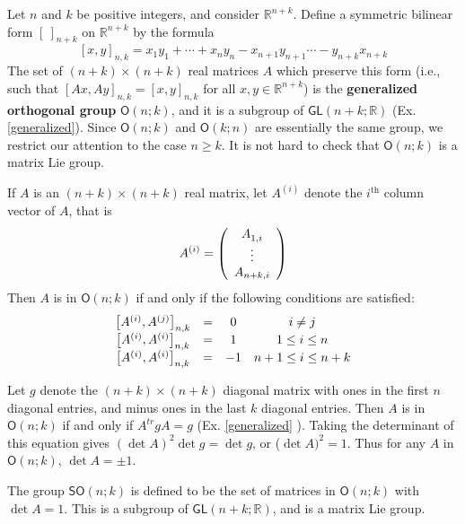 \documentclass{amsbook}
\theoremstyle{plain}
\numberwithin{equation}{chapter}
\numberwithin{theorem}{chapter}
\begin{document}
Let $n$ and $k$ be positive integers, and consider $\mathbb{R}^{n+k}$. Define
a symmetric bilinear form $\left[  \ \right]  _{n+k}$ on $\mathbb{R}^{n+k}$ by
the formula
\begin{equation}
\left[  x,y\right]  _{n,k}=x_{1}y_{1}+\cdots+x_{n}y_{n}-x_{n+1}y_{n+1}%
\cdots-y_{n+k}x_{n+k}\label{bilinear}%
\end{equation}
The set of $(n+k)\times(n+k)$ real matrices $A$ which preserve this form
(i.e., such that $\left[  Ax,Ay\right]  _{n,k}=\left[  x,y\right]  _{n,k}$ for
all $x,y\in\mathbb{R}^{n+k}$) is the \textbf{generalized orthogonal group}
$\mathsf{O}(n;k)$, and it is a subgroup of $\mathsf{GL}(n+k;\mathbb{R})$ (Ex.
\ref{generalized}). Since $\mathsf{O}(n;k)$ and $\mathsf{O}(k;n)$ are
essentially the same group, we restrict our attention to the case $n\geq k$.
It is not hard to check that $\mathsf{O}(n;k)$ is a matrix Lie group.

If $A$ is an $(n+k)\times(n+k)$ real matrix, let $A^{(i)}$ denote the
$i^{\text{th}}$ column vector of $A$, that is
\[
A^{(i)}=\left(
\begin{array}
[c]{c}%
A_{1,i}^{}\\
\vdots\\
A_{n+k,i}%
\end{array}
\right)
\]
Then $A$ is in $\mathsf{O}(n;k)$ if and only if the following conditions are
satisfied:
\begin{equation}%
\begin{array}
[c]{cccc}%
\left[  A^{(i)},A^{(j)}\right]  _{n,k} & = & 0 & i\neq j\\
\left[  A^{(i)},A^{(i)}\right]  _{n,k} & = & 1 & 1\leq i\leq n\\
\left[  A^{(i)},A^{(i)}\right]  _{n,k} & = & -1 & n+1\leq i\leq n+k
\end{array}
\end{equation}

Let $g$ denote the $(n+k)\times(n+k)$ diagonal matrix with ones in the first
$n$ diagonal entries, and minus ones in the last $k$ diagonal entries. Then
$A$ is in $\mathsf{O}(n;k)$ if and only if $A^{tr}gA=g$ (Ex. \ref{generalized}%
). Taking the determinant of this equation gives $(\det A)^{2}\det g=\det g$,
or ($\det A)^{2}=1$. Thus for any $A$ in $\mathsf{O}(n;k)$, $\det A=\pm1$.

The group $\mathsf{SO}(n;k)$ is defined to be the set of matrices in
$\mathsf{O}(n;k)$ with $\det A=1$. This is a subgroup of $\mathsf{GL}%
(n+k;\mathbb{R})$, and is a matrix Lie group.
\end{document}
